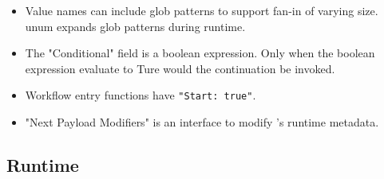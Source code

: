 \begin{itemize}
	\item Value names can include glob patterns to support fan-in of varying
	size. unum expands glob patterns during runtime.

	\item The "Conditional" field is a boolean expression. Only when the
	boolean expression evaluate to Ture would the continuation be invoked.

	\item Workflow entry functions have \texttt{"Start: true"}.

	\item "Next Payload Modifiers" is an interface to modify \name{}'s runtime
	metadata. 

\end{itemize}


\subsection{Runtime}\label{sec:design-runtime}

